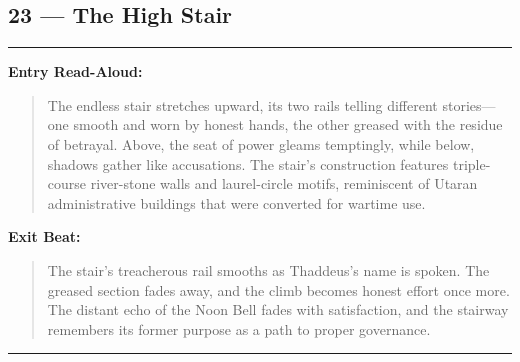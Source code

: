 \documentclass[18pt, letterpaper, twoside]{article}
\newenvironment{floorbox}[1]{%
    \begin{center}
    \begin{minipage}{0.95\textwidth}
    \subsection*{#1}
    \vspace{-0.5em}
    \rule{\textwidth}{0.5pt}
    \vspace{0.5em}
}{%
    \vspace{0.5em}
    \rule{\textwidth}{0.5pt}
    \end{minipage}
    \end{center}
}
\newenvironment{boxedtext}[1]{%
    \vspace{0.5em}
    \noindent\textbf{#1}
    \begin{quote}
}{%
    \end{quote}
    \vspace{0.5em}
}
\newcommand{\entrytext}[1]{\begin{boxedtext}{Entry Read-Aloud:} #1 \end{boxedtext}}
\newcommand{\exittext}[1]{\begin{boxedtext}{Exit Beat:} #1 \end{boxedtext}}
\begin{document}
\begin{floorbox}{23 --- The High Stair}
\entrytext{The endless stair stretches upward, its two rails telling different stories---one smooth and worn by honest hands, the other greased with the residue of betrayal. Above, the seat of power gleams temptingly, while below, shadows gather like accusations. The stair's construction features triple-course river-stone walls and laurel-circle motifs, reminiscent of Utaran administrative buildings that were converted for wartime use.}

\exittext{The stair's treacherous rail smooths as Thaddeus's name is spoken. The greased section fades away, and the climb becomes honest effort once more. The distant echo of the Noon Bell fades with satisfaction, and the stairway remembers its former purpose as a path to proper governance.}
\end{floorbox}
\end{document}
